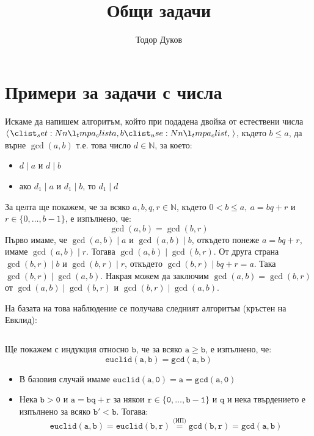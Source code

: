 \documentclass{article}
\title{Общи задачи}
\author{Тодор Дуков}
\date{}
\theoremstyle{definition}
\theoremstyle{plain}
\theoremstyle{remark}
\theoremstyle{definition}
\begin{document}
\maketitle

\section*{Примери за задачи с числа}

Искаме да напишем алгоритъм, който при подадена двойка от естествени числа $\opair{a, b}$, където $b \leq a$, да върне $\gcd(a, b)$ т.е. това число $d \in \mathbb{N}$, за което:
\begin{itemize}
  \item $d \mid a$ и $d \mid b$
  \item ако $d_1 \mid a$ и $d_1 \mid b$, то $d_1 \mid d$
\end{itemize}

За целта ще покажем, че за всяко $a, b, q, r \in \mathbb{N}$, където $0 < b \leq a, \: a = bq + r$ и $r \in \{ 0, \dots, b - 1 \}$, е изпълнено, че:
\[
  \gcd(a, b) = \gcd(b, r)
\]
Първо имаме, че $\gcd(a, b) \mid a$ и $\gcd(a, b) \mid b$, откъдето понеже $a = bq + r$, имаме $\gcd(a, b) \mid r$.
Тогава $\gcd(a, b) \mid \gcd(b, r)$.
От друга страна $\gcd(b, r) \mid b$ и $\gcd(b, r) \mid r$, откъдето $\gcd(b, r) \mid bq + r = a$.
Така $\gcd(b, r) \mid \gcd(a, b)$.
Накрая можем да заключим $\gcd(a, b) = \gcd(b, r)$ от $\gcd(a, b) \mid \gcd(b, r)$ и $\gcd(b, r) \mid \gcd(a, b)$.

На базата на това наблюдение се получава следният алгоритъм (кръстен на Евклид):
\inputminted[linenos]{c++}{algorithms/euclid.cpp}

Ще покажем с индукция относно $\mathtt{b}$, че за всяко $\mathtt{a \geq b}$, е изпълнено, че:
\[
  \mathtt{euclid(a, b) = gcd(a, b)}
\]
\begin{itemize}
  \item В базовия случай имаме $\mathtt{euclid(a, 0) = a = gcd(a, 0)}$
  \item Нека $\mathtt{b > 0}$ и $\mathtt{a = bq + r}$ за някои $\mathtt{r \in \{ 0, \dots, b - 1 \}}$ и $\mathtt{q}$ и нека твърдението е изпълнено за всяко $\mathtt{b' < b}$.
        Тогава:
        \[
          \mathtt{euclid(a, b) = euclid(b, r) \stackrel{\text{(ИП)}}{=} gcd(b, r) = gcd(a, b)}
        \]
\end{itemize}
\end{document}
